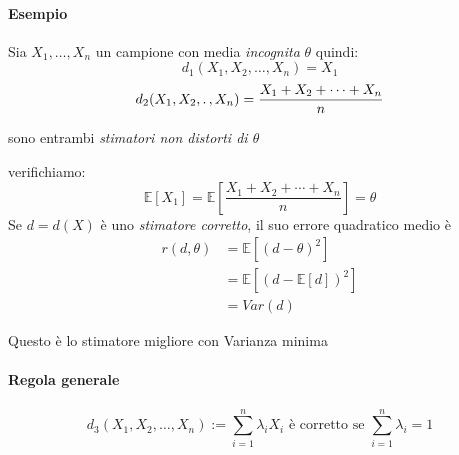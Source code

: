 \documentclass[]{article}
\newcommand{\ev}{\mathbb{E}[X]}
\renewcommand{\ev}[1]{\mathbb{E}\left[#1\right]}
\begin{document}
    \paragraph{Esempio} Sia $X_1, \ldots, X_n$ un campione con media \textit{incognita} $\theta$ quindi:
    \[ d_1 (X_1, X_2, \ldots, X_n) = X_1 \]
    \[ d_2 (X_1, X_2, \ldotp, X_n) = \frac{X_1 + X_2 + \cdots + X_n}{n} \]
    \centerline{sono entrambi \textit{stimatori non distorti di $\theta$}}
    verifichiamo:
    \[ \ev{X_1} = \ev{\frac{X_1 + X_2 + \cdots + X_n}{n}} = \theta \]
    Se $d = d(X)$ è uno \textit{stimatore corretto}, il suo errore quadratico medio è
    \begin{equation*}
        \begin{split}
            r(d, \theta) &= \ev{(d- \theta)^2} \\
            &= \ev{(d-\ev{d})^2} \\
            &= Var(d)
        \end{split}
    \end{equation*}
    \centerline{Questo è lo stimatore migliore con Varianza minima}
    \paragraph{Regola generale}
    \[ d_3(X_1, X_2, \ldots, X_n) := \sum_{i=1}^{n} \lambda_i X_i \text{  è corretto se } \sum_{i=1}^{n} \lambda_i = 1 \] 
\end{document}
